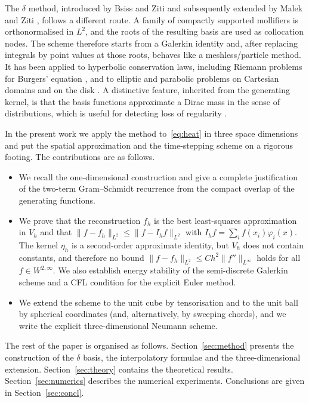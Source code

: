 \documentclass[final,3p,times]{elsarticle}
\theoremstyle{plain}
\theoremstyle{definition}
\theoremstyle{remark}
\newcommand{\dziti}{\ensuremath{\delta}\text{-Ziti}}
\begin{document}
The \dziti{} method, introduced by Bsiss and Ziti
\cite{Bsiss2016,Bsiss2017,Bsiss2023} and subsequently extended by Malek and
Ziti \cite{Malek2021,Malek2019Stokes,Malek2022}, follows a different route. A
family of compactly supported mollifiers is orthonormalised in $L^2$, and the
roots of the resulting basis are used as collocation nodes. The scheme
therefore starts from a Galerkin identity and, after replacing integrals by
point values at those roots, behaves like a meshless/particle method. It has
been applied to hyperbolic conservation laws, including Riemann problems for
Burgers' equation \cite{Bsiss2016,Yoon2008}, and to elliptic and parabolic
problems on Cartesian domains and on the disk \cite{Malek2021}. A distinctive
feature, inherited from the generating kernel, is that the basis functions
approximate a Dirac mass in the sense of distributions, which is useful for
detecting loss of regularity \cite{Malek2022,Malek2023}.

In the present work we apply the method to~\eqref{eq:heat} in three space
dimensions and put the spatial approximation and the time-stepping scheme on a
rigorous footing. The contributions are as follows.
\begin{itemize}
\item We recall the one-dimensional construction and give a complete
justification of the two-term Gram--Schmidt recurrence from the compact
overlap of the generating functions.
\item We prove that the reconstruction $f_h$ is the best least-squares
approximation in $V_h$ and that $\lVert f-f_h\rVert_{L^2}\le\lVert f-I_h f\rVert_{L^2}$
with $I_h f=\sum_{i}f(x_i)\varphi_i(x)$. The kernel $\eta_h$ is a second-order
approximate identity, but $V_h$ does not contain constants, and therefore
no bound $\lVert f-f_h\rVert_{L^2}\le C h^2\lVert f''\rVert_{L^\infty}$ holds
for all $f\in W^{2,\infty}$.
We also establish energy stability of the semi-discrete Galerkin scheme and a
CFL condition for the explicit Euler method.
\item We extend the scheme to the unit cube by tensorisation and to the unit
ball by spherical coordinates (and, alternatively, by sweeping chords), and we
write the explicit three-dimensional Neumann scheme.
\end{itemize}

The rest of the paper is organised as follows. Section~\ref{sec:method}
presents the construction of the \dziti{} basis, the interpolatory formulae
and the three-dimensional extension. Section~\ref{sec:theory} contains the
theoretical results. Section~\ref{sec:numerics} describes the numerical
experiments. Conclusions are given in Section~\ref{sec:concl}.
\end{document}
